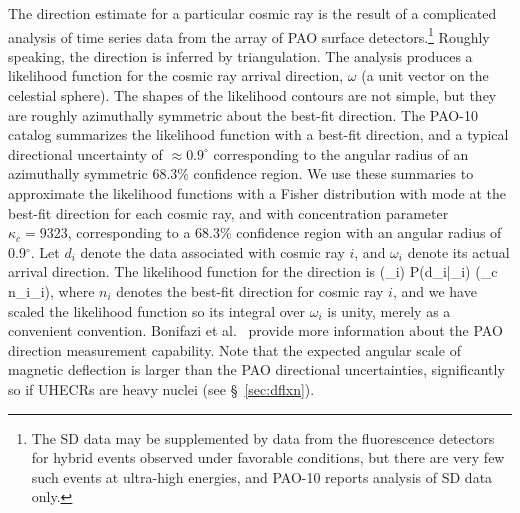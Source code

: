 The direction estimate for a particular cosmic ray is the result of a
complicated analysis of time series data from the array of PAO surface
detectors.\footnote{The SD data may be supplemented by data from the
fluorescence detectors for hybrid events observed under favorable
conditions, but there are very few such events at ultra-high energies,
and PAO-10 reports analysis of SD data only.}
Roughly speaking, the direction is inferred by triangulation. 
The analysis produces a likelihood function for the cosmic ray arrival
direction, $\omega$ (a unit vector on the celestial sphere).  The shapes of
the likelihood contours are not simple, but they are roughly azimuthally
symmetric about the best-fit direction.  The PAO-10 catalog summarizes the
likelihood function with a best-fit direction, and a typical directional
uncertainty of $\approx 0.9^\circ$ corresponding to the angular radius of an
azimuthally symmetric 68.3\% confidence region.  We use these summaries to
approximate the likelihood functions with a Fisher distribution with mode at
the best-fit direction for each cosmic ray, and with concentration parameter
$\kappa_c = 9323$, corresponding to a 68.3\% confidence region with an
angular radius of 0.9$^\circ$.  Let $d_i$ denote the data associated with
cosmic ray $i$, and $\omega_i$ denote its actual arrival direction.  The
likelihood function for the direction is
\ba
\ell(\omega_i)
  \coloneqq P(d_i|\omega_i)
   \approx {} \exp(\kappa_c n_i\cdot\omega_i),
\label{ell-def}
\ea
where $n_i$ denotes the best-fit direction for cosmic ray $i$, and we have
scaled the likelihood function so its integral over $\omega_i$ is unity,
merely as a convenient convention.  Bonifazi et al.\
\cite{B+PAO09-DrxnUncert} provide more information about the PAO direction
measurement capability.  Note that the expected angular scale of magnetic
deflection is larger than the PAO directional uncertainties, significantly
so if UHECRs are heavy nuclei (see \S~\ref{sec:dflxn}).

